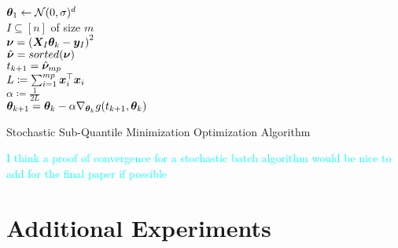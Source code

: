 \documentclass{article} %
\begin{document}
\begin{appendices}
\begin{algorithm}[H]
		${\bm{\theta}}_1 \gets \mathcal{N}(0,\sigma)^d$\\
		{
			$I \subseteq \left[n\right]$ of size $m$\\
			$\displaystyle {\bm{\nu}} = \left({\bm{X}}_I{\bm{\theta}}_k - {\bm{y}}_I\right)^2$\\
			$\hat{{\bm{\nu}}} = sorted({\bm{\nu}})$\\
			$\displaystyle t_{k+1} = \hat{{\bm{\nu}}}_{mp}$\\
			$L \coloneqq \sum_{i=1}^{mp} {\bm{x}}_i^\top{\bm{x}}_i$\\
			$\alpha \coloneqq \frac{1}{2L}$\\
			$\displaystyle {\bm{\theta}}_{k+1} = {\bm{\theta}}_k - \alpha \nabla_{{\bm{\theta}}_k}g(t_{k+1},{\bm{\theta}}_k)$
		}
		\caption{Stochastic Sub-Quantile Minimization Optimization Algorithm}
		\label{alg:sqo-stochastic}
	\end{algorithm}
	\textcolor{cyan}{I think a proof of convergence for a stochastic batch algorithm would be nice to add for the final paper if possible}
	
	\newpage
	
	\section{Additional Experiments}
	\label{app:additional-experiments}

\end{appendices}
\end{document}
